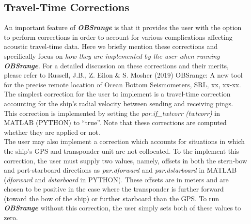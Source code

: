 \documentclass[titlepage, 12pt]{article}
\begin{document}
  \newpage
  
  \subsection{Travel-Time Corrections}
   \label{subsection:TTCs}

   An important feature of \textbf{\textit{OBSrange}} is that it provides the user with the option to perform corrections in order to account for various complications affecting acoustic travel-time data. Here we briefly mention these corrections and specifically focus on \textit{how they are implemented by the user when running \textbf{OBSrange}}. For a detailed discussion on these corrections and their merits, please refer to Russell, J.B., Z. Eilon \& S. Mosher (2019) OBSrange: A new tool for the precise remote location of Ocean Bottom Seismometers, SRL, xx, xx-xx.\\

   The simplest correction for the user to implement is a travel-time correction accounting for the ship's radial velocity between sending and receiving pings. This correction is implemented by setting the \textit{par.if\_twtcorr (twtcorr)} in MATLAB (PYTHON) to ``true''. Note that these corrections are computed whether they are applied or not.\\ 
   
   The user may also implement a correction which accounts for situations in which the ship's GPS and transponder unit are not collocated. To the implement this correction, the user must supply two values, namely, offsets in both the stern-bow and port-starboard directions as \textit{par.dforward} and \textit{par.dstarboard} in MATLAB (\textit{dforward} and \textit{dstarboard} in PYTHON). These offsets are in meters and are chosen to be positive in the case where the transponder is further forward (toward the bow of the ship) or further starboard than the GPS. To run \textbf{\textit{OBSrange}} without this correction, the user simply sets both of these values to zero.\\
\end{document}
